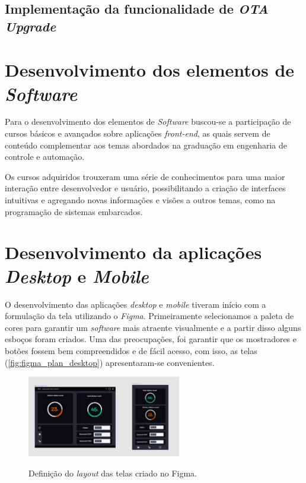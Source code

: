 \subsection{Implementação da funcionalidade de \textit{OTA Upgrade}}


\section{Desenvolvimento dos elementos de \textit{Software}}


Para o desenvolvimento dos elementos de \textit{Software} buscou-se a participação de cursos básicos e avançados sobre aplicações \textit{front-end}, as quais servem de conteúdo complementar aos temas abordados na graduação em engenharia de controle e automação.

Os cursos adquiridos trouxeram uma série de conhecimentos para uma maior interação entre desenvolvedor e usuário, possibilitando a criação de interfaces intuitivas e agregando novas informações e visões a outros temas, como na programação de sistemas embarcados.




\section{Desenvolvimento da aplicações \textit{Desktop} e \textit{Mobile}}

O desenvolvimento das aplicações \textit{desktop} e \textit{mobile} tiveram início com a formulação da tela utilizando o \textit{Figma}. Primeiramente selecionamos a paleta de cores para garantir um \textit{software} mais atraente visualmente e a partir disso alguns esboços foram criados. Uma das preocupações, foi garantir que os mostradores e botões fossem bem compreendidos e de fácil acesso, com isso, as telas (\autoref{fig:figma_plan_desktop}) apresentaram-se convenientes.

\begin{figure}[H]
	\centering
	\caption{Definição do \textit{layout} das telas criado no Figma.}
	\includegraphics[width=0.6\textwidth]{figuras/figma_plan.png}
	\label{fig:figma_plan_desktop}
\end{figure}



